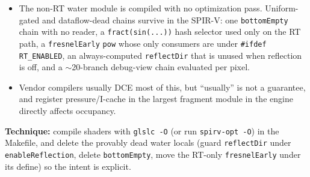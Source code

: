 \documentclass[11pt,a4paper]{article}
\begin{document}
\begin{itemize}
    \item The non-RT water module is compiled with no optimization pass. Uniform-gated and dataflow-dead chains survive in the SPIR-V: one \texttt{bottomEmpty} chain with no
    reader, a \texttt{fract(sin(...))} hash selector used only on the RT path, a \texttt{fresnelEarly} \texttt{pow} whose only consumers are under \texttt{\#ifdef RT\_ENABLED}, an
    always-computed \texttt{reflectDir} that is unused when reflection is off, and a $\sim$20-branch debug-view chain evaluated per pixel.
    \item Vendor compilers usually DCE most of this, but ``usually'' is not a guarantee, and register pressure/I-cache in the largest fragment module in the engine directly
    affects occupancy.
\end{itemize}

\textbf{Technique:} compile shaders with \texttt{glslc -O} (or run \texttt{spirv-opt -O}) in the Makefile, and delete the provably dead water locals (guard \texttt{reflectDir}
under \texttt{enableReflection}, delete \texttt{bottomEmpty}, move the RT-only \texttt{fresnelEarly} under its define) so the intent is explicit.
\end{document}
